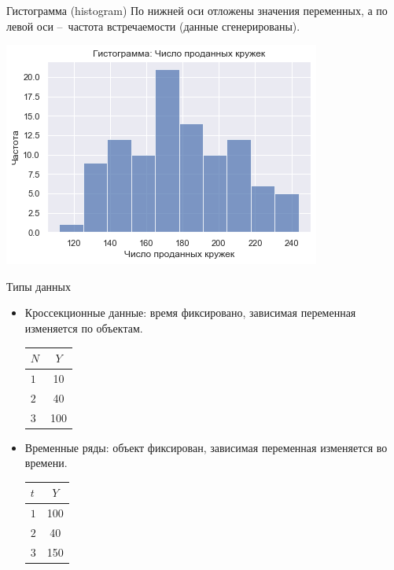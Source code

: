 \documentclass[c, handout]{beamer} %
\begin{document}
	\begin{frame}{Гистограмма (histogram)}
		По нижней оси отложены значения переменных, а по левой оси – частота встречаемости (данные сгенерированы).
		\begin{center}
			\includegraphics[width = 0.7\linewidth]{2.png}
		\end{center}
	\end{frame}

	\begin{frame}{Типы данных}
		\begin{itemize}
			\item<1-> \alert{Кроссекционные данные}: время фиксировано, зависимая переменная изменяется по объектам.
			
			\begin{center}
				\def\arraystretch{1.5}
				\begin{tabular}{l| c}
					\hline
					$N$ & $Y$ \\
					\hline
					$1$ & 10 \\
					$2$ & 40  \\
					$3$ & 100  \\
				\end{tabular}
			\end{center}
		
			\item<2-> Временные ряды: объект фиксирован, зависимая переменная изменяется во времени.
			
				\begin{center}
					\def\arraystretch{1.5}
					\begin{tabular}{l| c}
						\hline
						$t$ & $Y$ \\
						\hline
						$1$ & 100 \\
						$2$ & 40  \\
						$3$ & 150  \\
					\end{tabular}
				\end{center}
		\end{itemize}
	\end{frame}
\end{document}
